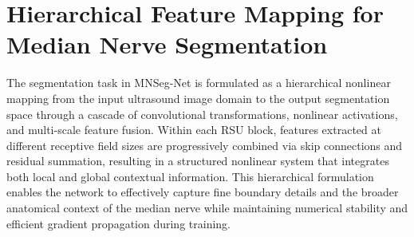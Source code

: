 \documentclass[12pt,letterpaper]{article}
\begin{document}
\section{Hierarchical Feature Mapping for Median Nerve Segmentation}
The segmentation task in MNSeg-Net is formulated as a hierarchical nonlinear mapping from the input ultrasound image domain to the output segmentation space through a cascade of convolutional transformations, nonlinear activations, and multi-scale feature fusion. Within each RSU block, features extracted at different receptive field sizes are progressively combined via skip connections and residual summation, resulting in a structured nonlinear system that integrates both local and global contextual information. This hierarchical formulation enables the network to effectively capture fine boundary details and the broader anatomical context of the median nerve while maintaining numerical stability and efficient gradient propagation during training.
\end{document}
